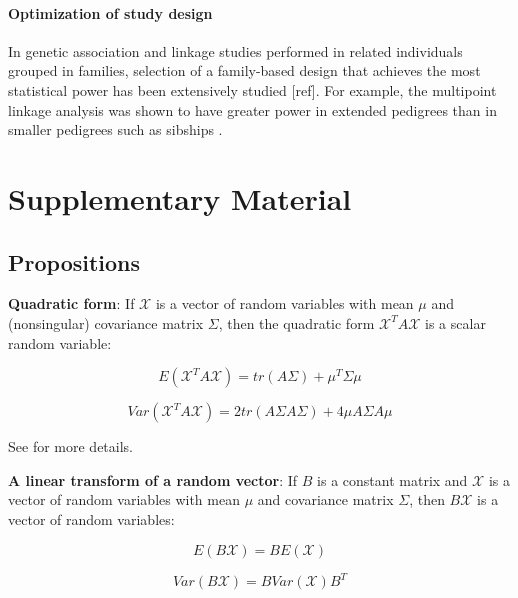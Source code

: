 \documentclass[]{book}
\begin{document}
\subsubsection{Optimization of study
design}\label{optimization-of-study-design}

In genetic association and linkage studies performed in related
individuals grouped in families, selection of a family-based design that
achieves the most statistical power has been extensively studied
{[}ref{]}. For example, the multipoint linkage analysis was shown to
have greater power in extended pedigrees than in smaller pedigrees such
as sibships \citep{Almasy1998}.

\chapter{Supplementary Material}\label{supplementary-material}

\section{Propositions}\label{propositions}

\textbf{Quadratic form}: If \(\mathcal{X}\) is a vector of random
variables with mean \(\mu\) and (nonsingular) covariance matrix
\(\Sigma\), then the quadratic form \(\mathcal{X}^T A \mathcal{X}\) is a
scalar random variable:

\begin{equation}
E(\mathcal{X}^T A \mathcal{X}) = tr(A\Sigma) + \mu^T \Sigma \mu
\label{eq:quadform1}
\end{equation}

\begin{equation}
Var(\mathcal{X}^T A \mathcal{X}) = 2tr(A \Sigma A \Sigma) + 4\mu A \Sigma A \mu
\label{eq:quadform2}
\end{equation}

See \citep[Appendix 3, pp.~843]{Lynch1998} for more details.

\textbf{A linear transform of a random vector}: If \(B\) is a constant
matrix and \(\mathcal{X}\) is a vector of random variables with mean
\(\mu\) and covariance matrix \(\Sigma\), then \(B \mathcal{X}\) is a
vector of random variables:

\begin{equation}
E(B \mathcal{X}) = B E(\mathcal{X})
\label{eq:matvec1}
\end{equation}

\begin{equation}
Var(B \mathcal{X}) = B Var(\mathcal{X}) B^T
\label{eq:matvec2}
\end{equation}
\end{document}
